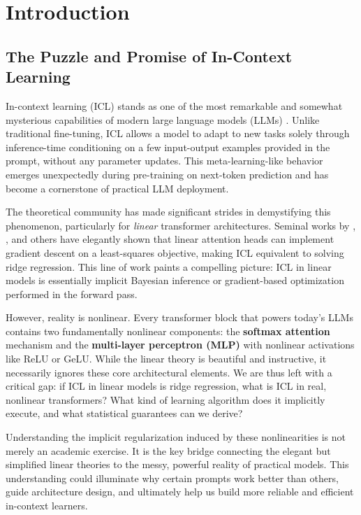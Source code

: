 \section{Introduction}
\label{sec:introduction}

\subsection{The Puzzle and Promise of In-Context Learning}
\label{subsec:background}

In-context learning (ICL) stands as one of the most remarkable and somewhat mysterious capabilities of modern large language models (LLMs) \cite{brown2020language}. Unlike traditional fine-tuning, ICL allows a model to adapt to new tasks solely through inference-time conditioning on a few input-output examples provided in the prompt, without any parameter updates. This meta-learning-like behavior emerges unexpectedly during pre-training on next-token prediction and has become a cornerstone of practical LLM deployment.

The theoretical community has made significant strides in demystifying this phenomenon, particularly for \textit{linear} transformer architectures. Seminal works by \cite{von2023linear}, \cite{akyurek2022learning}, and others have elegantly shown that linear attention heads can implement gradient descent on a least-squares objective, making ICL equivalent to solving ridge regression. This line of work paints a compelling picture: ICL in linear models is essentially implicit Bayesian inference or gradient-based optimization performed in the forward pass.

However, reality is nonlinear. Every transformer block that powers today's LLMs contains two fundamentally nonlinear components: the \textbf{softmax attention} mechanism and the \textbf{multi-layer perceptron (MLP)} with nonlinear activations like ReLU or GeLU. While the linear theory is beautiful and instructive, it necessarily ignores these core architectural elements. We are thus left with a critical gap: if ICL in linear models is ridge regression, what is ICL in real, nonlinear transformers? What kind of learning algorithm does it implicitly execute, and what statistical guarantees can we derive?

Understanding the implicit regularization induced by these nonlinearities is not merely an academic exercise. It is the key bridge connecting the elegant but simplified linear theories to the messy, powerful reality of practical models. This understanding could illuminate why certain prompts work better than others, guide architecture design, and ultimately help us build more reliable and efficient in-context learners.

